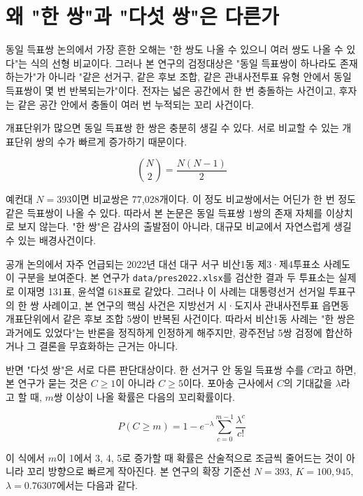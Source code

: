 \documentclass[preprint]{IEIE}
\begin{document}
\section{왜 "한 쌍"과 "다섯 쌍"은 다른가}

동일 득표쌍 논의에서 가장 흔한 오해는 "한 쌍도 나올 수 있으니 여러 쌍도 나올 수 있다"는 식의 선형 비교이다. 그러나 본 연구의 검정대상은 "동일 득표쌍이 하나라도 존재하는가"가 아니라 "같은 선거구, 같은 후보 조합, 같은 관내사전투표 유형 안에서 동일 득표쌍이 몇 번 반복되는가"이다. 전자는 넓은 공간에서 한 번 충돌하는 사건이고, 후자는 같은 공간 안에서 충돌이 여러 번 누적되는 꼬리 사건이다.

개표단위가 많으면 동일 득표쌍 한 쌍은 충분히 생길 수 있다. 서로 비교할 수 있는 개표단위 쌍의 수가 빠르게 증가하기 때문이다.

\[
\binom{N}{2} = \frac{N(N-1)}{2}
\]

예컨대 \(N=393\)이면 비교쌍은 77,028개이다. 이 정도 비교쌍에서는 어딘가 한 번 정도 같은 득표쌍이 나올 수 있다. 따라서 본 논문은 동일 득표쌍 1쌍의 존재 자체를 이상치로 보지 않는다. "한 쌍"은 감사의 출발점이 아니라, 대규모 비교에서 자연스럽게 생길 수 있는 배경사건이다.

공개 논의에서 자주 언급되는 2022년 대선 대구 서구 비산1동 제3·제4투표소 사례도 이 구분을 보여준다. 본 연구가 \texttt{data/pres2022.xlsx}를 검산한 결과 두 투표소는 실제로 이재명 131표, 윤석열 618표로 같았다. 그러나 이 사례는 대통령선거 선거일 투표구의 한 쌍 사례이고, 본 연구의 핵심 사건은 지방선거 시·도지사 관내사전투표 읍면동 개표단위에서 같은 후보 조합 5쌍이 반복된 사건이다. 따라서 비산1동 사례는 "한 쌍은 과거에도 있었다"는 반론을 정직하게 인정하게 해주지만, 광주전남 5쌍 검정에 합산하거나 그 결론을 무효화하는 근거는 아니다.

반면 "다섯 쌍"은 서로 다른 판단대상이다. 한 선거구 안 동일 득표쌍 수를 \(C\)라고 하면, 본 연구가 묻는 것은 \(C \ge 1\)이 아니라 \(C \ge 5\)이다. 포아송 근사에서 \(C\)의 기대값을 \(\lambda\)라고 할 때, \(m\)쌍 이상이 나올 확률은 다음의 꼬리확률이다.

\[
P(C \ge m) = 1 - e^{-\lambda}\sum_{c=0}^{m-1}\frac{\lambda^c}{c!}
\]

이 식에서 \(m\)이 1에서 3, 4, 5로 증가할 때 확률은 산술적으로 조금씩 줄어드는 것이 아니라 꼬리 방향으로 빠르게 작아진다. 본 연구의 확장 기준선 \(N=393\), \(K=100,945\), \(\lambda=0.76307\)에서는 다음과 같다.
\end{document}
